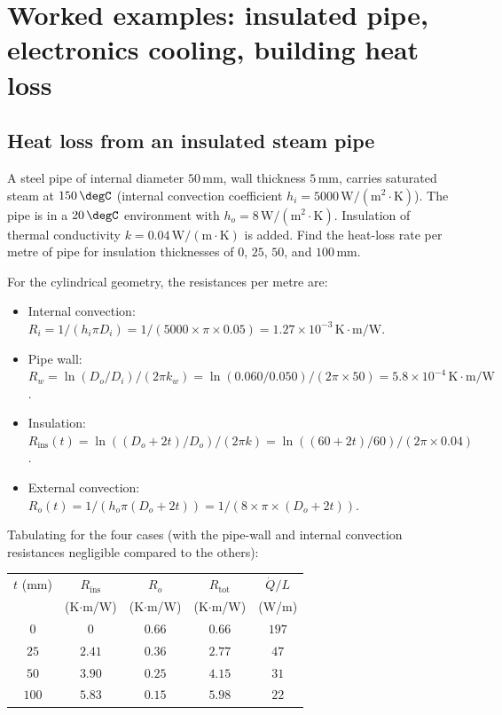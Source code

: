 \section{Worked examples: insulated pipe, electronics cooling, building heat loss}

\subsection{Heat loss from an insulated steam pipe}

A steel pipe of internal diameter $50\,\si{\milli\meter}$, wall
thickness $5\,\si{\milli\meter}$, carries saturated steam at $150\,\degC$
(internal convection coefficient $h_i = 5000\,\text{W}/(\text{m}^2
\cdot\si{\kelvin})$). The pipe is in a $20\,\degC$ environment with
$h_o = 8\,\text{W}/(\text{m}^2\cdot\si{\kelvin})$. Insulation of
thermal conductivity $k = 0.04\,\text{W}/(\text{m}\cdot\si{\kelvin})$
is added. Find the heat-loss rate per metre of pipe for insulation
thicknesses of $0$, $25$, $50$, and $100\,\si{\milli\meter}$.

For the cylindrical geometry, the resistances per metre are:
\begin{itemize}[leftmargin=*]
  \item Internal convection: $R_i = 1/(h_i \pi D_i) = 1/(5000 \times
    \pi \times 0.05) = 1.27 \times 10^{-3}\,\si{\kelvin}\cdot\text{m}/
    \text{W}$.
  \item Pipe wall: $R_w = \ln(D_o/D_i)/(2\pi k_w) = \ln(0.060/0.050)
    /(2\pi \times 50) = 5.8 \times 10^{-4}\,\si{\kelvin}\cdot\text{m}/
    \text{W}$.
  \item Insulation: $R_{\text{ins}}(t) = \ln((D_o + 2t)/D_o)/(2\pi k)
    = \ln((60 + 2t)/60)/(2\pi \times 0.04)$.
  \item External convection: $R_o(t) = 1/(h_o \pi (D_o + 2t)) = 1/(8
    \times \pi \times (D_o + 2t))$.
\end{itemize}

Tabulating for the four cases (with the pipe-wall and internal
convection resistances negligible compared to the others):

\begin{center}
\begin{tabular}{ccccc}
\toprule
$t$ (mm) & $R_{\text{ins}}$ & $R_o$ & $R_{\text{tot}}$ & $\dot{Q}/L$ \\
& (K$\cdot$m/W) & (K$\cdot$m/W) & (K$\cdot$m/W) & (W/m) \\
\midrule
$0$ & $0$ & $0.66$ & $0.66$ & $197$ \\
$25$ & $2.41$ & $0.36$ & $2.77$ & $47$ \\
$50$ & $3.90$ & $0.25$ & $4.15$ & $31$ \\
$100$ & $5.83$ & $0.15$ & $5.98$ & $22$ \\
\bottomrule
\end{tabular}
\end{center}

